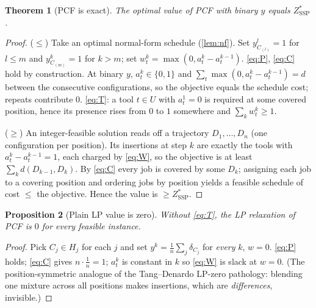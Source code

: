 \documentclass[11pt,a4paper]{article}
\theoremstyle{plain}
\newtheorem{theorem}{Theorem}[section]
\newtheorem{proposition}[theorem]{Proposition}
\theoremstyle{definition}
\newcommand{\ZSSP}{Z_{\mathrm{SSP}}^{*}}
\begin{document}
\begin{thmbox}
\begin{theorem}[PCF is exact]
\label{thm:pcf}
The optimal value of PCF with binary $y$ equals $\ZSSP$.
\end{theorem}
\end{thmbox}
\begin{proofbox}
\begin{proof}
($\le$) Take an optimal normal-form schedule (\cref{lem:nf}). Set $y^l_{C_{(l)}}=1$
for $l\le m$ and $y^k_{C_{(m)}}=1$ for $k>m$; set
$w_t^k=\max(0,a_t^k-a_t^{k-1})$. \eqref{eq:P}, \eqref{eq:C} hold by construction. At
binary $y$, $a_t^k\in\{0,1\}$ and $\sum_t\max(0,a_t^k-a_t^{k-1})=d$ between the
consecutive configurations, so the objective equals the schedule cost; repeats
contribute $0$. \eqref{eq:T}: a tool $t\in U$ with $a_t^1=0$ is required at some
covered position, hence its presence rises from $0$ to $1$ somewhere and
$\sum_kw_t^k\ge1$.

($\ge$) An integer-feasible solution reads off a trajectory $D_1,\dots,D_n$
(one configuration per position). Its insertions at step $k$ are exactly the tools
with $a_t^k-a_t^{k-1}=1$, each charged by \eqref{eq:W}, so the objective is at least
$\sum_k d(D_{k-1},D_k)$. By \eqref{eq:C} every job is covered by some $D_k$;
assigning each job to a covering position and ordering jobs by position yields a
feasible schedule of cost $\le$ the objective. Hence the value is $\ge\ZSSP$.
\end{proof}
\end{proofbox}

\begin{thmbox}
\begin{proposition}[Plain LP value is zero]
\label{prop:lp0}
Without \eqref{eq:T}, the LP relaxation of PCF is $0$ for every feasible instance.
\end{proposition}
\end{thmbox}
\begin{proofbox}
\begin{proof}
Pick $C_j\in H_j$ for each $j$ and set $y^k=\frac1n\sum_j\delta_{C_j}$ for
\emph{every} $k$, $w=0$. \eqref{eq:P} holds; \eqref{eq:C} gives
$n\cdot\frac1n=1$; $a_t^k$ is constant in $k$ so \eqref{eq:W} is slack at $w=0$.
(The position-symmetric analogue of the Tang--Denardo LP-zero pathology: blending one
mixture across all positions makes insertions, which are \emph{differences},
invisible.)
\end{proof}
\end{proofbox}
\end{document}
